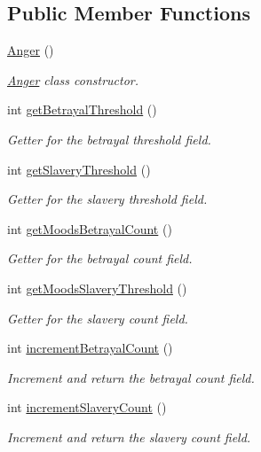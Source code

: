 \subsection*{Public Member Functions}
\begin{DoxyCompactItemize}
\item 
\hyperlink{a00003_aa4d68a49953f6fc22119d8825fd7e3d0}{Anger} ()
\begin{DoxyCompactList}\small\item\em \hyperlink{a00003}{Anger} class constructor. \end{DoxyCompactList}\item 
int \hyperlink{a00015_a766902de5008b4ff54729075fe0b66a6}{get\-Betrayal\-Threshold} ()
\begin{DoxyCompactList}\small\item\em Getter for the betrayal threshold field. \end{DoxyCompactList}\item 
int \hyperlink{a00015_a8c5dda351cf131a2e2a30a1570e2c7e7}{get\-Slavery\-Threshold} ()
\begin{DoxyCompactList}\small\item\em Getter for the slavery threshold field. \end{DoxyCompactList}\item 
int \hyperlink{a00015_aae8ae123bc9d3bae48e08ad15528aa5b}{get\-Moods\-Betrayal\-Count} ()
\begin{DoxyCompactList}\small\item\em Getter for the betrayal count field. \end{DoxyCompactList}\item 
int \hyperlink{a00015_a859eb2f9bae00ce3604d0fea5a690900}{get\-Moods\-Slavery\-Threshold} ()
\begin{DoxyCompactList}\small\item\em Getter for the slavery count field. \end{DoxyCompactList}\item 
int \hyperlink{a00015_a322adb08d4a6f7dcd0eb00c77649d2d2}{increment\-Betrayal\-Count} ()
\begin{DoxyCompactList}\small\item\em Increment and return the betrayal count field. \end{DoxyCompactList}\item 
int \hyperlink{a00015_ac416312a82ad5afce4090858b47b0c96}{increment\-Slavery\-Count} ()
\begin{DoxyCompactList}\small\item\em Increment and return the slavery count field. \end{DoxyCompactList}\item 

\end{DoxyCompactItemize}
